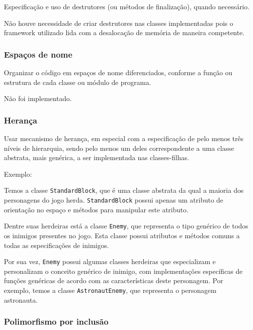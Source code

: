 \documentclass[rel_mlp]{iiufrgs}
\begin{document}
Especificação e uso de destrutores (ou métodos de finalização), quando necessário.

Não houve necessidade de criar destrutores nas classes implementadas pois o framework utilizado lida com a desalocação de memória de maneira competente.


\subsubsection{Espaços de nome}

Organizar o código em espaços de nome diferenciados, conforme a função ou estrutura de cada classe ou módulo de programa.

Não foi implementado.


\subsubsection{Herança}

Usar mecanismo de herança, em especial com a especificação de pelo menos três níveis de hierarquia, sendo pelo menos um deles correspondente a uma classe abstrata, mais genérica, a ser implementada nas classes-filhas.

Exemplo:

Temos a classe \texttt{StandardBlock}, que é uma classe abstrata da  qual a maioria dos personagens do jogo herda. \texttt{StandardBlock} possui apenas um atributo de orientação no espaço e métodos para manipular este atributo.

Dentre suas herdeiras está a classe \texttt{Enemy}, que representa o tipo genérico de todos os inimigos presentes no jogo. Esta classe possui atributos e métodos comuns a todas as especificações de inimigos.

Por sua vez, \texttt{Enemy} possui algumas classes herdeiras que especializam e personalizam o conceito genérico de inimigo, com implementações específicas de funções genéricas de acordo com as características deste personagem. Por exemplo, temos a classe \texttt{AstronautEnemy}, que representa o personagem astronauta.


\subsubsection{Polimorfismo por inclusão}
\end{document}

